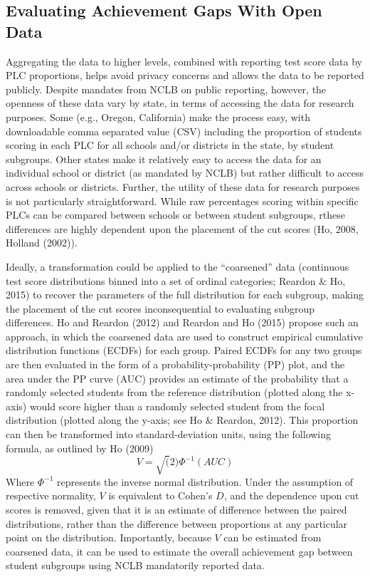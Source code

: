 \documentclass[man, fleqn, noextraspace]{apa6}
\theoremstyle{definition}
\theoremstyle{definition}
\theoremstyle{definition}
\theoremstyle{remark}
\begin{document}
\hypertarget{evaluating-achievement-gaps-with-open-data}{%
\subsection{Evaluating Achievement Gaps With Open
Data}\label{evaluating-achievement-gaps-with-open-data}}

Aggregating the data to higher levels, combined with reporting test
score data by PLC proportions, helps avoid privacy concerns and allows
the data to be reported publicly. Despite mandates from NCLB on public
reporting, however, the openness of these data vary by state, in terms
of accessing the data for research purposes. Some (e.g., Oregon,
California) make the process easy, with downloadable comma separated
value (CSV) including the proportion of students scoring in each PLC for
all schools and/or districts in the state, by student subgroups. Other
states make it relatively easy to access the data for an individual
school or district (as mandated by NCLB) but rather difficult to access
across schools or districts. Further, the utility of these data for
research purposes is not particularly straightforward. While raw
percentages scoring within specific PLCs can be compared between schools
or between student subgroups, rthese differences are highly dependent
upon the placement of the cut scores (Ho, 2008, Holland (2002)).

Ideally, a transformation could be applied to the \enquote{coarsened}
data (continuous test score distributions binned into a set of ordinal
categories; Reardon \& Ho, 2015) to recover the parameters of the full
distribution for each subgroup, making the placement of the cut scores
inconsequential to evaluating subgroup differences. Ho and Reardon
(2012) and Reardon and Ho (2015) propose such an approach, in which the
coarsened data are used to construct empirical cumulative distribution
functions (ECDFs) for each group. Paired ECDFs for any two groups are
then evaluated in the form of a probability-probability (PP) plot, and
the area under the PP curve (AUC) provides an estimate of the
probability that a randomly selected students from the reference
distribution (plotted along the x-axis) would score higher than a
randomly selected student from the focal distribution (plotted along the
y-axis; see Ho \& Reardon, 2012). This proportion can then be
transformed into standard-deviation units, using the following formula,
as outlined by Ho (2009) \begin{equation}
V = \sqrt(2)\Phi^{-1}(AUC)
\end{equation} Where \(\Phi^{-1}\) represents the inverse normal
distribution. Under the assumption of respective normality, \(V\) is
equivalent to Cohen's \(D\), and the dependence upon cut scores is
removed, given that it is an estimate of difference between the paired
distributions, rather than the difference between proportions at any
particular point on the distribution. Importantly, because \(V\) can be
estimated from coarsened data, it can be used to estimate the overall
achievement gap between student subgroups using NCLB mandatorily
reported data.
\end{document}
